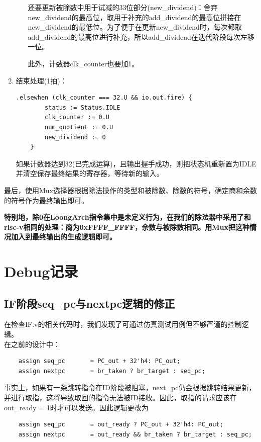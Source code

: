 \documentclass[11pt]{article}
\begin{document}
\begin{enumerate}
\begin{enumerate}
        还要更新被除数中用于试减的33位部分(new_dividend)：舍弃new_dividend的最高位，取用于补充的add_dividend的最高位拼接在new_dividend的最低位。为了便于在更新new_dividend时，每次都取add_dividend的最高位进行补充，所以add_dividend在迭代阶段每次左移一位。

        此外，计数器clk_counter也要加1。
    \end{enumerate}
    
    \item 结束处理(1拍)：
    \begin{lstlisting}[language=Chisel, caption={结束处理(1拍)}]
    .elsewhen (clk_counter === 32.U && io.out.fire) {
        status := Status.IDLE
        clk_counter := 0.U
        num_quotient := 0.U
        new_dividend := 0
    }
    \end{lstlisting}
    如果计数器达到32(已完成运算)，且输出握手成功，则把状态机重新置为IDLE并清空保存最终结果的寄存器，等待新的输入。

\end{enumerate}

最后，使用Mux选择器根据除法操作的类型和被除数、除数的符号，确定商和余数的符号作为最终输出即可。

\textbf{特别地，除0在LoongArch指令集中是未定义行为，在我们的除法器中采用了和risc-v相同的处理：商为0xFFFF_FFFF，余数与被除数相同。用Mux把这种情况加入到最终输出的生成逻辑即可。}


\section{Debug记录}

\subsection{IF阶段seq_pc与nextpc逻辑的修正}
    \indent 在检查IF.v的相关代码时，我们发现了可通过仿真测试用例但不够严谨的控制逻辑。\\
    \indent 在之前的设计中：
    \begin{lstlisting}
    assign seq_pc       = PC_out + 32'h4: PC_out;
    assign nextpc       = br_taken ? br_target : seq_pc;
    \end{lstlisting}

    \indent 事实上，如果有一条跳转指令在ID阶段被阻塞，next\_pc仍会根据跳转结果更新，并进行取指，这将导致取回的指令无法被ID接收。因此，取指的请求应该在out\_ready = 1时才可以发送。因此逻辑更改为
    \begin{lstlisting}
    assign seq_pc       = out_ready ? PC_out + 32'h4: PC_out;
    assign nextpc       = out_ready && br_taken ? br_target : seq_pc;
    \end{lstlisting}
\end{document}

